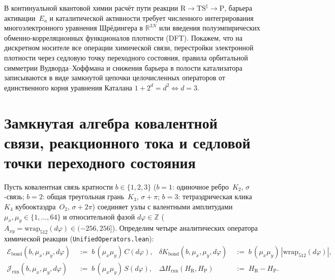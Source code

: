 В континуальной квантовой химии расчёт пути реакции $\mathrm{R} \to \mathrm{TS}^\ddagger \to \mathrm{P}$, барьера активации~$E_a$ и каталитической активности требует численного интегрирования многоэлектронного уравнения Шрёдингера в $\mathbb{R}^{3N}$ или введения полуэмпирических обменно-корреляционных функционалов плотности (DFT).
Покажем, что на дискретном носителе все операции химической связи, перестройки электронной плотности через седловую точку переходного состояния, правила орбитальной симметрии Вудворда--Хоффмана и снижения барьера в полости катализатора записываются в виде замкнутой цепочки целочисленных операторов от единственного корня уравнения Каталана $1+2^d=d^2 \iff d=3$.

\section{Замкнутая алгебра ковалентной связи, реакционного тока и седловой точки переходного состояния}
\label{sec:applied-chemical-operators}

Пусть ковалентная связь кратности $b \in \{1, 2, 3\}$ ($b=1$: одиночное ребро~$K_2$, $\sigma$-связь; $b=2$: общая треугольная грань~$K_3$, $\sigma+\pi$; $b=3$: тетраэдрическая клика~$K_4$ кубооктаэдра~$O_2$, $\sigma+2\pi$) соединяет узлы с валентными амплитудами $\mu_x,\mu_y \in \{1,\dots,64\}$ и относительной фазой $d\varphi \in \mathbb{Z}$ ($A_{xy} = \mathrm{wrap}_{512}(d\varphi) \in (-256, 256]$).
Определим четыре аналитических оператора химической реакции (\texttt{UnifiedOperators.lean}):
\begin{align}
\label{eq:applied-chem-bond-ops}
  \mathcal{E}_{\mathrm{bond}}(b,\mu_x,\mu_y,d\varphi) &\;:=\; b\,(\mu_x\mu_y)\,C(d\varphi), &
  \delta K_{\mathrm{bond}}(b,\mu_x,\mu_y,d\varphi) &\;:=\; b\,(\mu_x\mu_y)\,|\mathrm{wrap}_{512}(d\varphi)|, \\
\label{eq:applied-chem-current-enthalpy-ops}
  \mathcal{J}_{\mathrm{rxn}}(b,\mu_x,\mu_y,d\varphi) &\;:=\; b\,(\mu_x\mu_y)\,S(d\varphi), &
  \Delta H_{\mathrm{rxn}}(H_{\mathrm{R}}, H_{\mathrm{P}}) &\;:=\; H_{\mathrm{R}} - H_{\mathrm{P}}.
\end{align}

